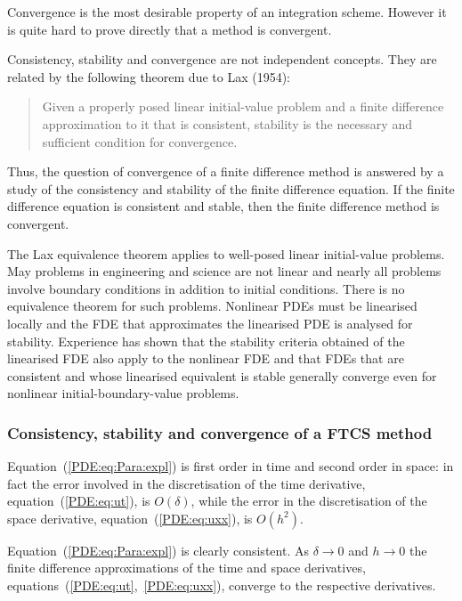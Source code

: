 \begin{enumerate}
  Convergence is the most desirable property of an integration scheme.
  However it is quite hard to prove directly that a method is
  convergent.
%
\end{enumerate}

Consistency, stability and convergence are not independent concepts.
They are related by the following theorem due to Lax (1954):

\begin{quote}
  Given a properly posed linear initial-value problem and a finite
  difference approximation to it that is consistent, stability is the
  necessary and sufficient condition for convergence.
\end{quote}

Thus, the question of convergence of a finite difference method is
answered by a study of the consistency and stability of the finite
difference equation.  If the finite difference equation is consistent
and stable, then the finite difference method is convergent.

The Lax equivalence theorem applies to well-posed linear initial-value
problems.  May problems in engineering and science are not linear and
nearly all problems involve boundary conditions in addition to initial
conditions.  There is no equivalence theorem for such problems.
Nonlinear PDEs must be linearised locally and the FDE that
approximates the linearised PDE is analysed for stability.  Experience
has shown that the stability criteria obtained of the linearised FDE
also apply to the nonlinear FDE and that FDEs that are consistent and
whose linearised equivalent is stable generally converge even for
nonlinear initial-boundary-value problems.

\subsubsection{Consistency, stability and convergence of a FTCS
method}

Equation~(\ref{PDE:eq:Para:expl}) is first order in time and second
order in space: in fact the error involved in the discretisation of
the time derivative, equation~(\ref{PDE:eq:ut}), is $O(\delta)$, while
the error in the discretisation of the space derivative,
equation~(\ref{PDE:eq:uxx}), is $O(h^2)$.

Equation~(\ref{PDE:eq:Para:expl}) is clearly consistent.  As $\delta
\to 0$ and $h \to 0$ the finite difference approximations of the time
and space derivatives, equations~(\ref{PDE:eq:ut},~\ref{PDE:eq:uxx}),
converge to the respective derivatives.

